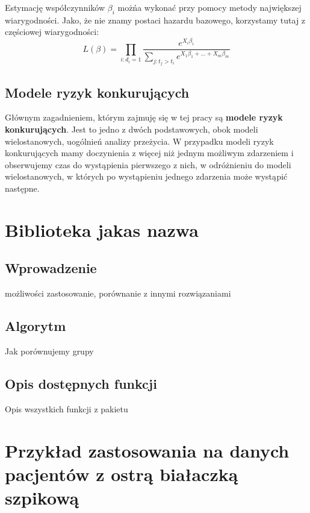 \documentclass[]{pracamgr}
\begin{document}
Estymację współczynników $\beta_i$ możńa wykonać przy pomocy metody największej wiarygodności. Jako, że nie znamy postaci hazardu bazowego, korzystamy tutaj z częściowej wiarygodności:
\begin{equation}
L(\beta) = \prod_{i: d_{i} = 1} \frac{e^{X_{i}\beta_{i}}}{\sum_{j:t_{j}>t_{i}}e^{X_{1}\beta_{1}+...+X_{m}\beta_{m}}}
\end{equation}









\section{Modele ryzyk konkurujących}\label{comp risks}

Głównym zagadnieniem, którym zajmuję się w tej pracy są \textbf{modele ryzyk konkurujących}. Jest to jedno z dwóch podstawowych, obok modeli wielostanowych, uogólnień analizy przeżycia. W przypadku modeli ryzyk konkurujących mamy doczynienia z więcej niż jednym możliwym zdarzeniem i obserwujemy czas do wystąpienia pierwszego z nich, w odróżnieniu do modeli wielostanowych, w których po wystąpieniu jednego zdarzenia może wystąpić następne.

\chapter{Biblioteka jakas nazwa}\label{r:losers}

\section{Wprowadzenie}

możliwości zastosowanie, porównanie z innymi rozwiązaniami

\section{Algorytm}

Jak porównujemy grupy

\section{Opis dostępnych funkcji}

Opis wszystkich funkcji z pakietu

\chapter{Przykład zastosowania na danych pacjentów z ostrą białaczką szpikową}\label{r:fifak}
\end{document}
